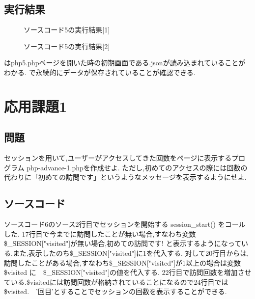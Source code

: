 \documentclass[a4j,10pt]{jsarticle}
\begin{document}
\subsection{実行結果}

\begin{figure}[H]
  \centering
  \caption{ソースコード5の実行結果[1]}
\label{fig:fig9}
\end{figure}

\begin{figure}[H]
  \centering
  \caption{ソースコード5の実行結果[2]}
\label{fig:fig10}
\end{figure}


はphp5.phpページを開いた時の初期画面である.jsonが読み込まれていることがわかる.
で永続的にデータが保存されていることが確認できる.

\newpage

\section{応用課題1}

\subsection{問題}

  セッションを用いて,ユーザーがアクセスしてきた回数をページに表示するプログラム
  php-advance-1.phpを作成せよ.
  ただし,初めてのアクセスの際には回数の代わりに「初めての訪問です」というようなメッセージを表示するようにせよ.

\subsection{ソースコード}

ソースコード6のソース2行目でセッションを開始する session\_start() をコールした.
17行目で今までに訪問したことが無い場合,すなわち変数\$\_SESSION["visited"]が無い場合,初めての訪問です! と表示するようになっている.また,表示したのち\$\_SESSION["visited"]に1を代入する.
対して20行目からは,訪問したことがある場合,すなわち\$\_SESSION["visited"]が1以上の場合は変数 \$visited に　\$\_SESSION["visited"]の値を代入する.
22行目で訪問回数を増加させている.\$visitedには訪問回数が格納されていることになるので24行目では \$visited.　'回目'とすることでセッションの回数を表示することができる.
\end{document}
